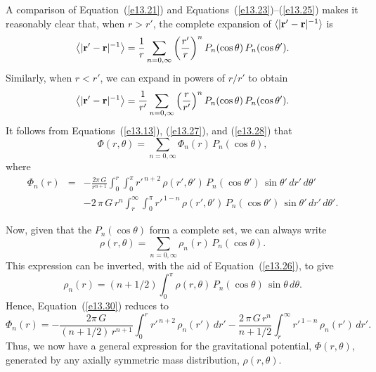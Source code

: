 A comparison of Equation~(\ref{e13.21}) and Equations~(\ref{e13.23})--(\ref{e13.25}) makes it reasonably clear  that, when $r>r'$, the complete  expansion
of $\langle|{\bf r}'-{\bf r}|^{-1}\rangle$  is
\begin{equation}\label{e13.27}
\left\langle|{\bf r}'-{\bf r}|^{-1}\right\rangle = \frac{1}{r}\sum_{n=0,\infty}
\left(\frac{r'}{r}\right)^n P_n(\cos\theta)\,P_n(\cos\theta').
\end{equation}
Similarly, when $r < r'$, we can expand in powers of $r/r'$ to obtain
\begin{equation}\label{e13.28}
\left\langle|{\bf r}'-{\bf r}|^{-1}\right\rangle = \frac{1}{r'}\sum_{n=0,\infty}
\left(\frac{r}{r'}\right)^n P_n(\cos\theta)\,P_n(\cos\theta').
\end{equation}
It follows from Equations~(\ref{e13.13}), (\ref{e13.27}), and (\ref{e13.28})
that
\begin{equation}\label{e13.29}
\Phi(r,\theta) = \sum_{n=0,\infty} \Phi_n(r)\,P_n(\cos\theta),
\end{equation}
where
\begin{eqnarray}\label{e13.30}
\Phi_n(r) &=& -\frac{2\pi\,G}{r^{n+1}}\int_0^r \int_0^\pi r'^{\,n+2}\,
\rho(r',\theta')\,P_n(\cos\theta')\,\sin\theta'\,dr'\,d\theta'\nonumber\\[0.5ex]
&&-2\,\pi\,G\,r^n\int_r^\infty \int_0^\pi r'^{\,1-n}\,
\rho(r',\theta')\,P_n(\cos\theta')\,\sin\theta'\,dr'\,d\theta'.
\end{eqnarray}

Now, given that the $P_n(\cos\theta)$ form a complete set, we can always
write
\begin{equation}\label{e13.31}
\rho(r,\theta) = \sum_{n=0,\infty} \rho_n(r)\,P_n(\cos\theta).
\end{equation}
This expression can be inverted, with the aid of Equation~(\ref{e13.26}), to
give
\begin{equation}
\rho_n(r) = (n+1/2)\int_0^\pi\rho(r,\theta)\,P_n(\cos\theta)\,\sin\theta\,d\theta.
\end{equation}
Hence, Equation~(\ref{e13.30}) reduces to
\begin{equation}\label{e13.33}
\Phi_n(r) = -\frac{2\pi\,G}{(n+1/2)\,r^{n+1}}\int_0^r r'^{\,n+2}\,\rho_n(r')\,dr'-\frac{2\,\pi\,G\,r^n}{n+1/2}\int_r^\infty r'^{\,1-n}\,\rho_n(r')\,dr'.
\end{equation}
Thus, we now have a general expression for the gravitational potential,
$\Phi(r,\theta)$,
generated by any axially symmetric mass distribution, $\rho(r,\theta)$.

